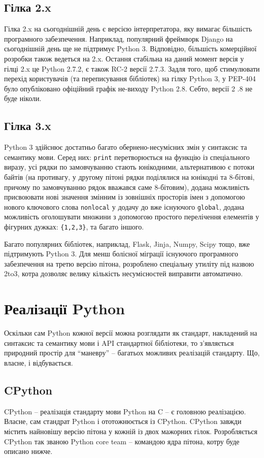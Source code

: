 \documentclass[a4paper, 12pt, onsedie]{article}
\begin{document}
\subsection{Гілка 2.x}
Гілка 2.x на сьогоднішній день є версією інтерпретатора, яку вимагає більшість програмного
забезпечення. Наприклад, популярний фреймворк Django на сьогоднішній день ще не підтримує
Python 3. Відповідно, більшість комерційної розробки також ведеться на 2.x.
Остання стабільна на даний момент версія у гілці 2.x це Python 2.7.2, є також RC-2 версії 2.7.3.
Задля того, щоб стимулювати перехід користувачів (та переписування бібліотек) на гілку 
Python 3, у PEP-404 було опубліковано офіційний графік не-виходу Python 2.8. Себто, версії 2
.8 не буде ніколи. 

\subsection{Гілка 3.x}
Python 3 здійснює достатньо багато обернено-несумісних змін у синтаксис та семантику мови.
Серед них: \texttt{print} перетворюється на функцію із спеціального виразу, усі рядки по
замовчуванню стають юнікодними, альтернативою є потоки байтів (на противагу, у другому
пітоні рядки поділялися на юнікодні та 8-бітові, причому по замовчуванню рядок вважався
саме 8-бітовим), додана можливість присвоювати нові значення змінним із зовнішніх просторів
імен з допомогою нового ключового слова \texttt{nonlocal} у додачу до вже існуючого 
\texttt{global}, додана можливість оголошувати множини з допомогою простого перелічення
елементів у фігурних дужках: \texttt{\{1,2,3\}}, та багато іншого.

Багато популярних бібліотек, наприклад, Flask, Jinja, Numpy, Scipy тощо, вже підтримують
Python 3. Для менш болісної міграції існуючого програмного забезпечення на третю версію
пітона, розроблено спеціальну утиліту під назвою 2to3, котра дозволяє велику кількість
несумісностей виправити автоматично.

\section{Реалізації Python}
Оскільки сам Python кожної версії можна розглядати як стандарт, накладений на синтаксис та
семантику мови і API стандартної бібліотеки, то з'являється природний простір для ``маневру''
 -- багатьох можливих реалізацій стандарту. Що, власне, і відбувається.

\subsection{CPython}
CPython -- реалізація стандарту мови Python на C -- є головною реалізацією. Власне, сам
стандрат Python і ототожнюється із CPython. CPython завжди містить найновішу версію пітона 
у кожній із двох мажорних гілок. Розробляється CPython так званою Python core team -- 
командою ядра пітона, котру буде описано нижче.
\end{document}
